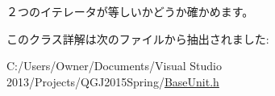 ２つのイテレータが等しいかどうか確かめます。



このクラス詳解は次のファイルから抽出されました\+:\begin{DoxyCompactItemize}
\item 
C\+:/\+Users/\+Owner/\+Documents/\+Visual Studio 2013/\+Projects/\+Q\+G\+J2015\+Spring/\hyperlink{_base_unit_8h}{Base\+Unit.\+h}\end{DoxyCompactItemize}
